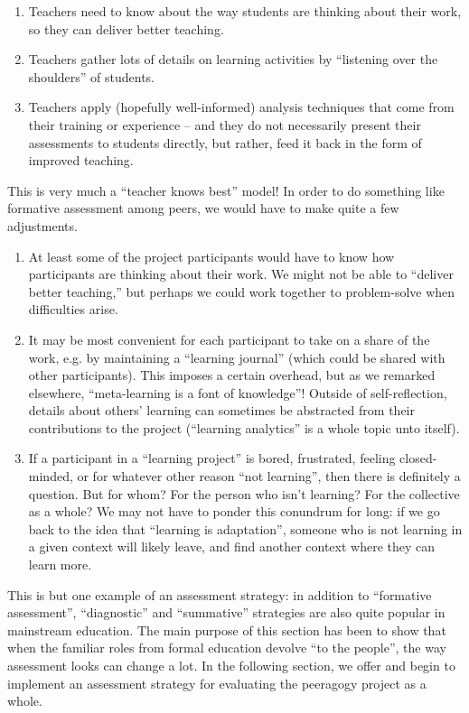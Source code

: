 \begin{enumerate}
\item
  Teachers need to know about the way students are thinking about their
  work, so they can deliver better teaching.
\item
  Teachers gather lots of details on learning activities by ``listening
  over the shoulders'' of students.
\item
  Teachers apply (hopefully well-informed) analysis techniques that come
  from their training or experience -- and they do not necessarily
  present their assessments to students directly, but rather, feed it
  back in the form of improved teaching.
\end{enumerate}
This is very much a ``teacher knows best'' model! In order to do
something like formative assessment among peers, we would have to make
quite a few adjustments.

\begin{enumerate}
\item
  At least some of the project participants would have to know how
  participants are thinking about their work. We might not be able to
  ``deliver better teaching,'' but perhaps we could work together to
  problem-solve when difficulties arise.
\item
  It may be most convenient for each participant to take on a share of
  the work, e.g. by maintaining a ``learning journal'' (which could be
  shared with other participants). This imposes a certain overhead, but
  as we remarked elsewhere, ``meta-learning is a font of knowledge''!
  Outside of self-reflection, details about others' learning can
  sometimes be abstracted from their contributions to the project
  (``learning analytics'' is a whole topic unto itself).
\item
  If a participant in a ``learning project'' is bored, frustrated,
  feeling closed-minded, or for whatever other reason ``not learning'',
  then there is definitely a question. But for whom? For the person who
  isn't learning? For the collective as a whole? We may not have to
  ponder this conundrum for long: if we go back to the idea that
  ``learning is adaptation'', someone who is not learning in a given
  context will likely leave, and find another context where they can
  learn more.
\end{enumerate}
This is but one example of an assessment strategy: in addition to
``formative assessment'', ``diagnostic'' and ``summative'' strategies
are also quite popular in mainstream education. The main purpose of this
section has been to show that when the familiar roles from formal
education devolve ``to the people'', the way assessment looks can change
a lot. In the following section, we offer and begin to implement an
assessment strategy for evaluating the peeragogy project as a whole.


